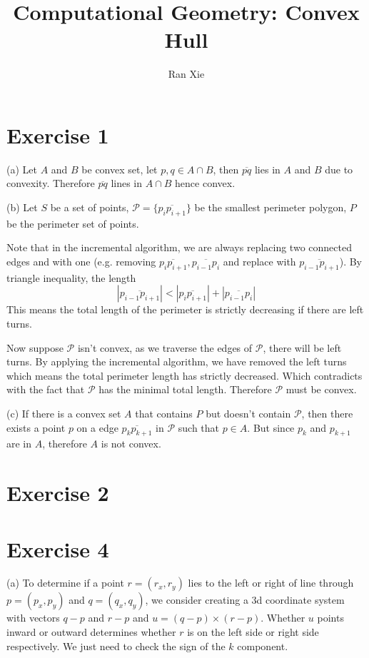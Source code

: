 \documentclass[12pt]{article}
\title{Computational Geometry: Convex Hull}
\author{Ran Xie}
\begin{document}
\maketitle

\section*{Exercise 1}

(a) Let $A$ and $B$ be convex set, let $p, q\in A \cap B$, then $\overline{pq}$ lies in $A$ and $B$ due to convexity. Therefore $\overline{pq}$ lines in $A\cap B$ hence convex.

(b) 
Let $S$ be a set of points, $\mathcal{P} = \{\overline{p_ip_{i+1}}\}$ be the smallest perimeter polygon, $P$ be the perimeter set of points.

Note that in the incremental algorithm, we are always replacing two connected edges and with one (e.g. removing $\overline{p_{i}p_{i+1}}, \overline{p_{i-1}p_{i}}$ and replace with $\overline{p_{i-1}p_{i+1}}$).
 By triangle inequality, the length $$|\overline{p_{i-1}p_{i+1}}| < |\overline{p_{i}p_{i+1}}| + |\overline{p_{i-1}p_{i}}|$$
This means the total length of the perimeter is strictly decreasing if there are left turns.

Now suppose $\mathcal{P}$ isn't convex, as we traverse the edges of $\mathcal{P}$, there will be left turns. By applying the incremental algorithm, we have removed the left turns which means the total perimeter length has strictly decreased. Which contradicts with the fact that $\mathcal{P}$ has the minimal total length. Therefore $\mathcal{P}$ must be convex. 

(c) If there is a convex set $A$ that contains $P$ but doesn't contain $\mathcal{P}$, then there exists a point $p$ on a edge $\overline{{p_k p_{k+1}}}$ in $\mathcal{P}$ such that $p \in A$. But since $p_k$ and $p_{k+1}$ are in $A$, therefore $A$ is not convex.


\section*{Exercise 2}


\section*{Exercise 4}
(a) To determine if a point $r=(r_x, r_y)$ lies to the left or right of line through $p=(p_x,p_y)$ and $q=(q_x, q_y)$, we consider creating a 3d coordinate system with vectors $q - p$ and $r - p$ and $u = (q - p) \times (r - p)$. Whether $u$ points inward or outward determines whether $r$ is on the left side or right side respectively. We just need to check the sign of the $k$ component.
\end{document}
